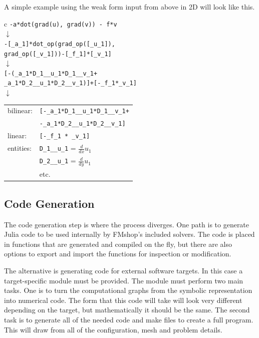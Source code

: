 \documentclass[twoside,leqno,twocolumn]{article}
\begin{document}
A simple example using the weak form input from above in 2D will look like this.\\

\begin{tabular}{c}
\texttt{-a*dot(grad(u), grad(v)) - f*v}\\
$\downarrow$\\
\texttt{-[\_a\_1]*dot\_op(grad\_op([\_u\_1]),}\\ \texttt{grad\_op([\_v\_1]))-[\_f\_1]*[\_v\_1]}\\
$\downarrow$\\
\texttt{[-(\_a\_1*D\_1\_\_u\_1*D\_1\_\_v\_1+}\\ \texttt{\_a\_1*D\_2\_\_u\_1*D\_2\_\_v\_1)]+[-\_f\_1*\_v\_1]}\\
$\downarrow$\\
\begin{tabular}{ll}
bilinear: & \texttt{[-\_a\_1*D\_1\_\_u\_1*D\_1\_\_v\_1+}\\ & \texttt{-\_a\_1*D\_2\_\_u\_1*D\_2\_\_v\_1]}\\
linear: & \texttt{[-\_f\_1 * \_v\_1]}\\
entities: & \texttt{D\_1\_\_u\_1} = $\frac{d}{dx}u_1$\\
 & \texttt{D\_2\_\_u\_1} = $\frac{d}{dy}u_1$\\
 & etc.
\end{tabular}
\end{tabular}

\subsection{Code Generation}
The code generation step is where the process diverges. One path is to generate Julia code to be used internally by FMshop's included solvers. The code is placed in functions that are generated and compiled on the fly, but there are also options to export and import the functions for inspection or modification.

The alternative is generating code for external software targets. In this case a target-specific module must be provided. The module must perform two main tasks. One is to turn the computational graphs from the symbolic representation into numerical code. The form that this code will take will look very different depending on the target, but mathematically it should be the same. The second task is to generate all of the needed code and make files to create a full program. This will draw from all of the configuration, mesh and problem details.
\end{document}
